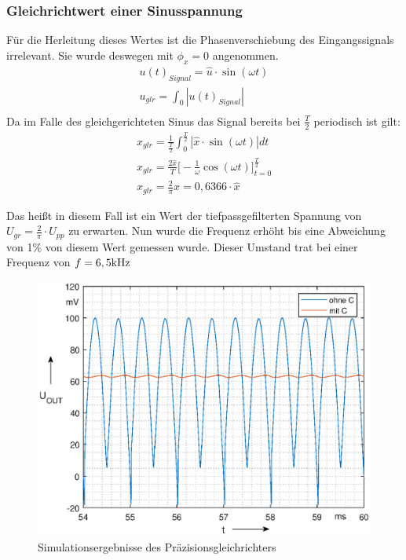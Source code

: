 \subsubsection{Gleichrichtwert einer Sinusspannung}
Für die Herleitung dieses Wertes ist die Phasenverschiebung des Eingangssignals irrelevant. Sie wurde deswegen mit $\phi_x = 0$ angenommen. 
\begin{align}
    u(t)_{Signal} =  \hat{u} \cdot \sin(\omega t) \\   
    u_{glr} = \int_{0}{|u(t)_{Signal}|} \\
\end{align}
Da im Falle des gleichgerichteten Sinus das Signal bereits bei $\frac{T}{2}$ periodisch ist gilt:
\begin{align}
x_{glr} = \frac{1}{\frac{T}{2}}\int _{0} ^{\frac{T}{2}} |\hat{x} \cdot \sin{(\omega t)}|dt\\
x_{glr} = \frac{2\hat{x}}{T} \bigl\lbrack -\frac{1}{\omega}\cos{(\omega t)} \bigr\rbrack ^{\frac{T}{2}} _{t=0} \\
x_{glr} = \frac{2}{\pi} \hat{x} = 0,6366\cdot \hat{x}
\end{align}

Das heißt in diesem Fall ist ein Wert der tiefpassgefilterten Spannung von $U_{gr} =\frac{2}{\pi}\cdot U_{pp}$ zu erwarten. Nun wurde die Frequenz erhöht bis eine Abweichung von 1\% von diesem Wert gemessen wurde. Dieser Umstand trat bei einer Frequenz von $f=6,5\text{kHz}$

\begin{figure}[H]
    \centering
    \includegraphics[width=\costumPicWidth]{Lab_3/Plots/Gleichrichter.eps}
    \caption{Simulationsergebnisse des Präzisionsgleichrichters}
    \label{fig:sim_Gleichrichter}
\end{figure}

